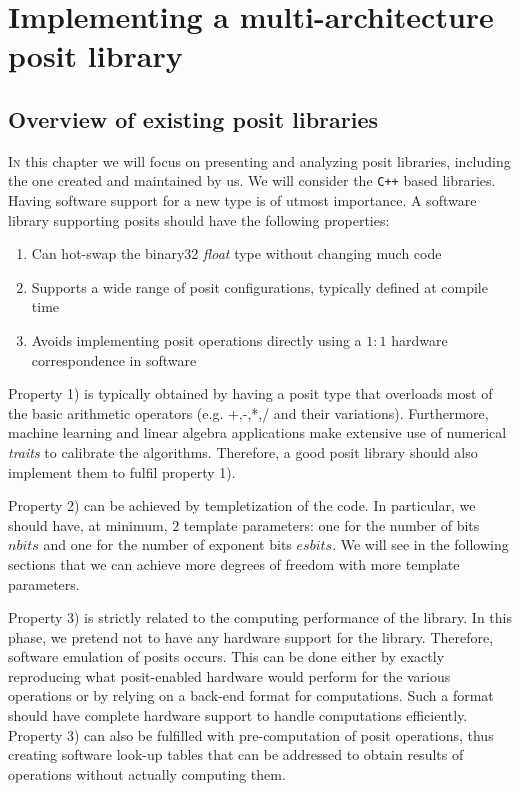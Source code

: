 \chapter{Implementing a multi-architecture posit library}\label{chap:posit_library}


\section{Overview of existing posit libraries}

\lettrine{I}{n} this chapter we will focus on presenting and analyzing posit libraries, including the one created and maintained by us. We will consider the \texttt{C++} based libraries.
Having software support for a new type is of utmost importance. A software library supporting posits should have the following properties:
\begin{enumerate}
    \item Can hot-swap the binary32  \textit{float} type without changing much code
    \item Supports a wide range of posit configurations, typically defined at compile time
    \item Avoids implementing posit operations directly using a $1:1$ hardware correspondence in software 
\end{enumerate}

Property 1) is typically obtained by having a posit type that overloads most of the basic arithmetic operators (e.g. +,-,*,/ and their variations). Furthermore, machine learning and linear algebra applications make extensive use of numerical \textit{traits} to calibrate the algorithms. Therefore, a good posit library should also implement them to fulfil property 1). 

Property 2) can be achieved by templetization of the code. In particular, we should have, at minimum, $2$ template parameters: one for the number of bits $nbits$ and one for the number of exponent bits $esbits$. We will see  in the following sections that we can achieve more degrees of freedom with more template parameters.

Property 3) is strictly related to the computing performance of the library. In this phase, we pretend not to have any hardware support for the library. Therefore, software emulation of posits occurs. This can be done either by exactly reproducing what posit-enabled hardware would perform for the various operations or by relying on a back-end format for computations. Such a format should have complete hardware support to handle computations efficiently. Property 3) can also be fulfilled with pre-computation of posit operations, thus creating software look-up tables that can be addressed to obtain results of operations without actually computing them.


